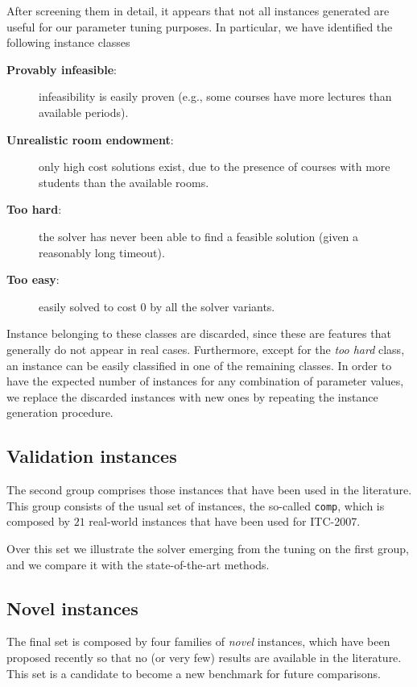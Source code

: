 \documentclass[authoryear,12pt]{article}
\begin{document}
After screening them in detail, it appears that not all instances generated are
useful for our parameter tuning purposes. In particular, we have identified the
following instance classes

\begin{description}
    \item[\textbf{Provably infeasible}:] infeasibility is easily proven (e.g., some courses have more lectures than available periods).
    \item[\textbf{Unrealistic room endowment}:] only high cost solutions exist,
      due to the presence of courses with more students than the
      available rooms.
    \item[\textbf{Too hard}:] the solver has never been able to find a feasible solution (given a reasonably long timeout).
    \item[\textbf{Too easy}:] easily solved to cost $0$ by all the solver variants.
\end{description}

Instance belonging to these classes are discarded, since these are features that
generally do not appear in real cases. Furthermore, except for the \emph{too
hard} class, an instance can be easily classified in one of the remaining
classes. In order to have the expected number of instances for any combination
of parameter values, we replace the discarded instances with new ones by
repeating the instance generation procedure.

\subsection{Validation instances}
\label{sec:comp-instances}

The second group comprises those instances that have been used in the
literature. This group consists of the usual set of instances, the so-called
\texttt{comp}, which is composed by $21$ real-world instances that have been
used for ITC-2007.

Over this set we illustrate the solver emerging from the tuning on the first
group, and we compare it with the state-of-the-art methods.

\subsection{Novel instances}
\label{sec:new-instances}

The final set is composed by four families of \emph{novel} instances, which have
been proposed recently so that no (or very few) results are available in the
literature. This set is a candidate to become a new benchmark for future
comparisons.
\end{document}
